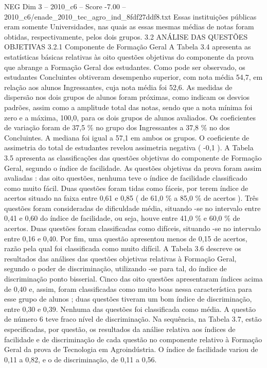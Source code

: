 \begin{textsample}{NEG Dim 3 – 2010\_c6 – Score -7.00 – 2010\_c6/enade\_2010\_tec\_agro\_ind\_8fdf27ddf8.txt}
Essas instituições públicas eram somente Universidades, nas quais as essas mesmas médias de notas foram obtidas, respectivamente, pelos dois grupos. 3.2 ANÁLISE DAS QUESTÕES OBJETIVAS 3.2.1 Componente de Formação Geral A Tabela 3.4 apresenta as estatísticas básicas relativas às oito questões objetivas do componente da prova que abrange a Formação Geral dos estudantes.
Como pode ser observado, os estudantes Concluintes obtiveram desempenho superior, com nota média 54,7, em relação aos alunos Ingressantes, cuja nota média foi 52,6.
As medidas de dispersão nos dois grupos de alunos foram próximas, como indicam os desvios padrões, assim como a amplitude total das notas, sendo que a nota mínima foi zero e a máxima, 100,0, para os dois grupos de alunos avaliados.
Os coeficientes de variação foram de 37,5 \% no grupo dos Ingressantes a 37,8 \% no dos Concluintes.
A mediana foi igual a 57,1 em ambos os grupos.
O coeficiente de assimetria do total de estudantes revelou assimetria negativa ( -0,1 ).
A Tabela 3.5 apresenta as classificações das questões objetivas do componente de Formação Geral, segundo o índice de facilidade.
As questões objetivas da prova foram assim avaliadas : das oito questões, nenhuma teve o índice de facilidade classificado como muito fácil.
Duas questões foram tidas como fáceis, por terem índice de acertos situado na faixa entre 0,61 e 0,85 ( de 61,0 \% a 85,0 \% de acertos ).
Três questões foram consideradas de dificuldade média, situando -se no intervalo entre 0,41 e 0,60 do índice de facilidade, ou seja, houve entre 41,0 \% e 60,0 \% de acertos.
Duas questões foram classificadas como difíceis, situando -se no intervalo entre 0,16 e 0,40.
Por fim, uma questão apresentou menos de 0,15 de acertos, razão pela qual foi classificada como muito difícil.
A Tabela 3.6 descreve os resultados das análises das questões objetivas relativas à Formação Geral, segundo o poder de discriminação, utilizando -se para tal, do índice de discriminação ponto bisserial.
Cinco das oito questões apresentaram índices acima de 0,40 e, assim, foram classificadas como muito boas nessa característica para esse grupo de alunos ; duas questões tiveram um bom índice de discriminação, entre 0,30 e 0,39.
Nenhuma das questões foi classificada como média.
A questão de número 6 teve fraco nível de discriminação.
Na sequência, na Tabela 3.7, estão especificadas, por questão, os resultados da análise relativa aos índices de facilidade e de discriminação de cada questão no componente relativo à Formação Geral da prova de Tecnologia em Agroindústria.
O índice de facilidade variou de 0,11 a 0,82, e o de discriminação, de 0,11 a 0,56.

\end{textsample}
